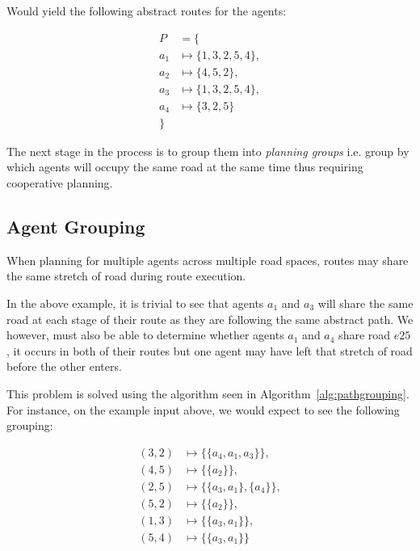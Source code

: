 Would yield the following abstract routes for the agents:


\begin{align*}
  P &= \{ \\
  a_{1} &\mapsto \{ 1,3,2,5,4 \}, \\
  a_{2} &\mapsto \{ 4,5,2 \}, \\
  a_{3} &\mapsto \{ 1,3,2,5,4 \} ,\\
  a_{4} &\mapsto \{ 3,2,5 \} \\
          \}
\end{align*}

The next stage in the process is to group them into \textit{planning groups} i.e. group by which agents will occupy the same road at the same time thus requiring cooperative planning.

\subsection{Agent Grouping}

When planning for multiple agents across multiple road spaces, routes may share the same stretch of road during route execution.

In the above example, it is trivial to see that agents $a_{1}$ and $a_{3}$ will share the same road at each stage of their route as they are following the same abstract path. We however, must also be able to determine whether agents $a_{1}$ and $a_{4}$ share road $e25$, it occurs in both of their routes but one agent may have left that stretch of road before the other enters.

This problem is solved using the algorithm seen in Algorithm~\ref{alg:pathgrouping}. For instance, on the example input above, we would expect to see the following grouping:

\begin{align*}
  (3,2) &\mapsto \{ \{ a_4,a_1,a_3 \}  \}, \\
  (4,5) &\mapsto \{ \{ a_2 \}  \}, \\
  (2,5) &\mapsto \{ \{ a_3,a_1 \}, \{ a_4 \}   \}, \\
  (5,2) &\mapsto \{ \{ a_2 \}  \} , \\
  (1,3) &\mapsto \{ \{ a_3,a_1 \}  \} , \\
  (5,4) &\mapsto \{ \{ a_3,a_1 \}  \}
\end{align*}

